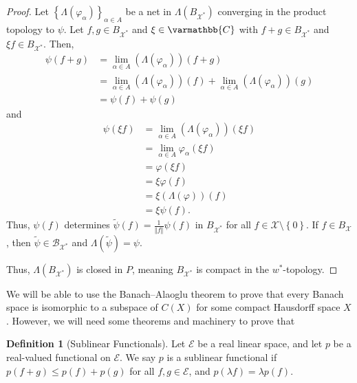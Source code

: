 \documentclass[10pt]{extarticle}
\newcommand{\C}{\mathbb{C}}
\newcommand{\norm}[1]{\left\Vert #1\right\Vert}
\newcommand{\set}[1]{\left\{#1\right\}}
\theoremstyle{plain}
\theoremstyle{definition}
\newtheorem*{definition}{Definition}
\theoremstyle{note}
\renewcommand*{\mathbb}[1]{\varmathbb{#1}}
\renewcommand{\newline}{\hfill\break}
\begin{document}
\begin{proof}
  Let $\set{\Lambda\left(\varphi_{\alpha}\right)}_{\alpha\in A}$ be a net in $\Lambda\left(B_{\mathcal{X}^{\ast}}\right)$ converging in the product topology to $\psi$. Let $f,g \in B_{\mathcal{X}^{\ast}}$ and $\xi \in \C$ with $f+g\in B_{\mathcal{X}^{\ast}}$ and $\xi f \in B_{\mathcal{X}^{\ast}}$. Then,
  \begin{align*}
    \psi\left(f+g\right) &= \lim_{\alpha \in A}\left(\Lambda\left(\varphi_{\alpha}\right)\right)(f+g)\\
                         &= \lim_{\alpha \in A}\left(\Lambda\left(\varphi_{\alpha}\right)\right)(f) + \lim_{\alpha \in A}\left(\Lambda\left(\varphi_{\alpha}\right)\right)(g)\\
                         &= \psi(f) + \psi(g)
  \end{align*}
  and
  \begin{align*}
    \psi(\xi f) &= \lim_{\alpha \in A}\left(\Lambda\left(\varphi_{\alpha}\right)\right)(\xi f)\\
                 &= \lim_{\alpha \in A}\varphi_{\alpha}\left(\xi f\right)\\
                 &= \varphi\left(\xi f\right)\\
                 &= \xi \varphi\left(f\right)\\
                 &= \xi \left(\Lambda\left(\varphi\right)\right)(f)\\
                 &= \xi \psi(f).
  \end{align*}
  Thus, $\psi(f)$ determines $\tilde{\psi}(f) = \frac{1}{\norm{f}}\psi\left(f\right)$ in $B_{\mathcal{X}^{\ast}}$ for all $f\in \mathcal{X}\setminus \set{0}$. If $f\in B_{\mathcal{X}}$, then $\tilde{\psi} \in \mathcal{B}_{\mathcal{X}^{\ast}}$ and $\Lambda(\tilde{\psi}) = \psi$.\newline

  Thus, $\Lambda\left(B_{\mathcal{X}^{\ast}}\right)$ is closed in $P$, meaning $B_{\mathcal{X}^{\ast}}$ is compact in the $w^{\ast}$-topology.
\end{proof}
We will be able to use the Banach--Alaoglu theorem to prove that every Banach space is isomorphic to a subspace of $C(X)$ for some compact Hausdorff space $X$. However, we will need some theorems and machinery to prove that
\begin{definition}[Sublinear Functionals]
  Let $\mathcal{E}$ be a real linear space, and let $p$ be a real-valued functional on $\mathcal{E}$. We say $p$ is a sublinear functional if $p(f+g)\leq p(f) + p(g)$ for all $f,g\in \mathcal{E}$, and $p(\lambda f) = \lambda p(f)$.
\end{definition}
\end{document}
